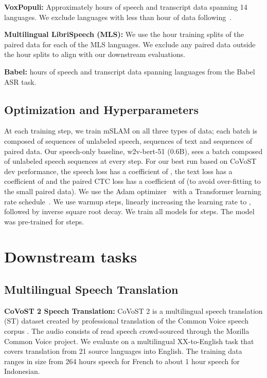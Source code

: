 \documentclass[nohyperref]{article}
\newcommand{\wvbert}{w2v-bert-51 (0.6B)}
\newcommand{\mslam}{mSLAM}
\begin{document}
\textbf{VoxPopuli:} Approximately  hours of speech and transcript data spanning 14 languages. We exclude languages with less than  hour of data following~\citet{wang2021voxpopuli}.

\textbf{Multilingual LibriSpeech (MLS):} We use the  hour training splits of the paired data for each of the  MLS languages. We exclude any paired data outside the  hour splits to align with our downstream evaluations.

\textbf{Babel:}  hours of speech and transcript data spanning  languages from the Babel ASR task.

\subsection{Optimization and Hyperparameters}
\label{subsec:pretrain-opt}
At each training step, we train \mslam{} on all three types of data; each batch is composed of  sequences of unlabeled speech,  sequences of text and  sequences of paired data. Our speech-only baseline, \wvbert, sees a batch composed of  unlabeled speech sequences at every step. For our best run based on CoVoST dev performance, the speech loss has a coefficient of , the text loss has a coefficient of  and the paired CTC loss has a coefficient of  (to avoid over-fitting to the small paired data). We use the Adam optimizer~\citep{kingma2014adam} with a Transformer learning rate schedule~\citep{vaswani2017attention}. We use  warmup steps, linearly increasing the learning rate to , followed by inverse square root decay. We train all  models for  steps. The  model was pre-trained for  steps.

\section{Downstream tasks}
\label{sec:tasks}

\subsection{Multilingual Speech Translation}
\label{subsec:tasks-ast}
\textbf{CoVoST 2 Speech Translation:} CoVoST 2 \cite{wang2020covost} is a multilingual speech translation (ST) dataset created by professional translation of the Common Voice speech corpus \citep{ardila2020common}. The audio consists of read speech crowd-sourced through the Mozilla Common Voice project. We evaluate on a multilingual XX-to-English task that covers translation from 21 source languages into English. The training data ranges in size from 264 hours speech for French to about 1 hour speech for Indonesian. 
\end{document}
